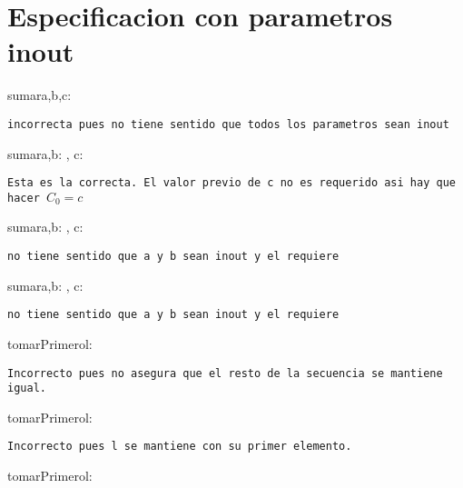 \documentclass[10pt,a4paper]{article}
\begin{document}
\section*{Especificacion con parametros inout}
\begin{proc}{sumar}{\Inout a,b,c: \ent}{}
    \requiere{\True}
\end{proc}
{\texttt{\color{red}incorrecta pues no tiene sentido que todos los parametros sean inout}}
\salto{\baselineskip}
\begin{proc}{sumar}{\In a,b: \ent, \Inout c: \ent}{}
    \requiere{\True}
\end{proc}
{\texttt{\color{red}Esta es la correcta. El valor previo de c no es requerido asi hay que hacer $C_0=c$}}
\salto{\baselineskip}
\begin{proc}{sumar}{\Inout a,b: \ent, \Inout c: \ent}{}
\end{proc}
{\texttt{\color{red}no tiene sentido que a y b sean inout y el requiere}}
\salto{\baselineskip}
\begin{proc}{sumar}{\Inout a,b: \ent, \Inout c: \ent}{}
\end{proc}
{\texttt{\color{red}no tiene sentido que a y b sean inout y el requiere}}
\begin{proc}{tomarPrimero}{\Inout l: \TLista{\float}}{\float}
\end{proc}
\texttt{\color{red}Incorrecto pues no asegura que el resto de la secuencia se mantiene igual.}
\begin{proc}{tomarPrimero}{\Inout l: \TLista{\float}}{\float}
\end{proc}
\texttt{\color{red}Incorrecto pues l se mantiene con su primer elemento.}
\begin{proc}{tomarPrimero}{\Inout l: \TLista{\float}}{\float}
\end{proc}
\end{document}
